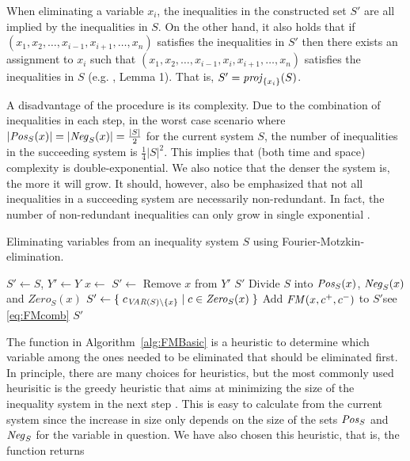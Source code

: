 When eliminating a variable $x_i$, the inequalities in the constructed set $S'$ are all implied by the inequalities in $S$. On the other hand, it also holds that if $(x_1, x_2, \ldots, x_{i-1}, x_{i+1}, \ldots, x_n)$ satisfies the inequalities in $S'$ then there exists an assignment to $x_i$ such that $(x_1, x_2, \ldots, x_{i-1}, x_i, x_{i+1}, \ldots, x_n)$ satisfies the inequalities in $S$ {(e.g. \cite{duffin74}, Lemma 1)}. That is, $S' = \mathit{proj}_{\{x_i\}}(S)$.

A disadvantage of the procedure is its complexity. Due to the combination of inequalities in each step, in the worst case scenario where $|\mathit{Pos}_S(x)| = |\mathit{Neg}_S(x)| = \frac{|S|}{2}$ for the current system $S$, the number of inequalities in the succeeding system is $\frac{1}{4}|S|^2$. This implies that (both time and space) complexity is double-exponential.  
We also notice that the denser the system is, the more it will grow. 
It should, however, also be emphasized that not all inequalities in a succeeding system are necessarily non-redundant. In fact, the
number of non-redundant inequalities can only grow in single exponential \cite{Monniaux10}.
%
\begin{algorithmic}
\begin{algorithm}\caption{Eliminating variables from an inequality system $S$ using Fourier-Motzkin-elimination.}
\label{alg:FMBasic}
	\State  $S'\gets S$, $Y'\gets Y$
		\State $x\gets$ 
		\State $S' \gets$ 
		\State Remove $x$ from $Y'$
	\EndWhile
	\State \Return $S'$
\EndFunction
\State
{}
\State Divide $S$ into $\mathit{Pos}_S(x)$, $\mathit{Neg}_S(x)$ and $\mathit{Zero}_S(x)$
\State $S'\gets \{\;{c_{\mathit{VAR}(S)\setminus\{x\}}}\;|\;{c\in\mathit{Zero}_S(x)}\;\}$ 
		\State Add $\mathit{FM}(x,c^+, c^-)$ to $S'$\Comment see \eqref{eq:FMcomb}
	\EndFor
\EndFor
\State \Return $S'$
\EndFunction
\end{algorithm}
\end{algorithmic}
%
The function  in Algorithm~\ref{alg:FMBasic} is a heuristic to determine which variable among the ones needed to be eliminated that should be eliminated first. In principle, there are many choices for heuristics, but the most commonly used heurisitic is the greedy heuristic that aims at minimizing the size of the inequality system in the next step \cite{duffin74}. This is easy to calculate from the current system since the increase in size only depends on the size of the sets $\mathit{Pos}_S$ and $\mathit{Neg}_S$ for the variable in question. We have also chosen this heuristic, that is, the function  returns 
